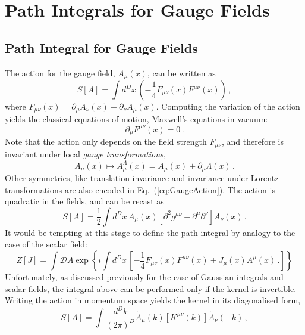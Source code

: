 \documentclass[notes]{subfiles}
\renewcommand{\munu}{{\mu\nu}}
\begin{document}
\chapter{Path Integrals for Gauge Fields}
\label{cha:path-integrals-gauge}
\section{Path Integral for Gauge Fields}
\label{sec:gauge-fields}

The action for the gauge field, $A_\mu(x)$, can be written as
\begin{equation}
  \label{eq:GaugeAction}
  S[A] = \int d^Dx\, \left(-\frac14 F_{\mu\nu}(x)
    F^{\mu\nu}(x)\right)\, ,
\end{equation}
where $F_{\mu\nu}(x)=\partial_\mu A_\nu(x) - \partial_\nu A_\mu(x)$. 
Computing the variation of the action yields the classical equations
of motion, \ie Maxwell's equations in vacuum: 
\begin{equation}
  \label{eq:MaxEqs}
  \partial_\mu F^{\mu\nu}(x) = 0\, .
\end{equation}
Note that the action only depends on the field strength $F_\munu$,
and therefore is invariant under local \emph{gauge transformations},
\begin{equation}
  \label{eq:GaugeTransf}
  A_\mu(x) \mapsto A^\Lambda_\mu(x) = A_\mu(x) + \partial_\mu \Lambda(x)\, .
\end{equation}
Other symmetries, like translation invariance and invariance under
Lorentz transformations are also encoded in
Eq.~(\ref{eq:GaugeAction}). 
The action is quadratic in the fields, and can be recast as 
\begin{equation}
  \label{eq:GaugeActionTwo}
  S[A] = \frac12 \int d^Dx\, A_\mu(x) \left[
    \partial^2 g^{\mu\nu} - \partial^\mu \partial^\nu
    \right] A_\nu(x)\, .
\end{equation}
It would be tempting at this stage to define the path integral by
analogy to the case of the scalar field:
\begin{equation}
  \label{eq:WrongPathInt}
  Z[J] = \int \mathcal{D}A \exp\left\{
    i \int d^Dx\, \left[
      -\frac14 F_{\mu\nu}(x) F^\munu(x) + J_\mu(x) A^\mu(x)\, .
      \right]
    \right\}
\end{equation}
Unfortunately, as discussed previously for the case of Gaussian
integrals and scalar fields, the integral above can be performed only
if the kernel is invertible. Writing the action in momentum space
yields the kernel in its diagonalised form, 
\begin{equation}
  \label{eq:GaugeActionMom}
  S[A] = \int \frac{d^Dk}{(2\pi)^D} \tilde{A}_\mu(k) \left[
    K^\munu(k)
    \right] \tilde{A}_\nu(-k)\, ,
\end{equation}
\end{document}

